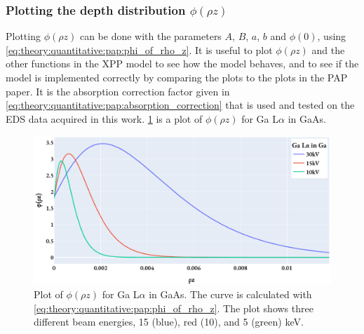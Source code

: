 







\subsubsection{Plotting the depth distribution $\phi(\rho z)$} 

Plotting $\phi(\rho z)$ can be done with the parameters $A$, $B$, $a$, $b$ and $\phi(0)$, using \cref{eq:theory:quantitative:pap:phi_of_rho_z}.
It is useful to plot $\phi(\rho z)$ and the other functions in the XPP model to see how the model behaves, and to see if the model is implemented correctly by comparing the plots to the plots in the PAP paper.
It is the absorption correction factor given in \cref{eq:theory:quantitative:pap:absorption_correction} that is used and tested on the EDS data acquired in this work.
\cref{fig:pap:phi_of_rhoz} is a plot of $\phi(\rho z)$ for Ga L$\alpha$ in GaAs.

\begin{figure}[htbp]
    \centering
    \includegraphics[width=0.8\linewidth]{figures/PAP_phi_of_rhoz.pdf}
    \caption{
        Plot of $\phi(\rho z)$ for Ga L$\alpha$ in GaAs.
        The curve is calculated with \cref{eq:theory:quantitative:pap:phi_of_rho_z}.
        The plot shows three different beam energies, 15 (blue), red (10), and 5 (green) keV.
    }
    \label{fig:pap:phi_of_rhoz}
\end{figure}



